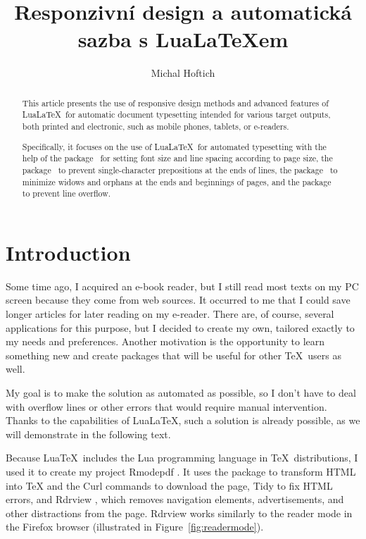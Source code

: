 \documentclass{ltugboat}
\title{Responzivní design a automatická sazba s Lua\LaTeX em}
\author{Michal Hoftich}
\newcommand\program[1]{#1}
\begin{document}
\maketitle

\begin{abstract}
This article presents the use of responsive design methods and advanced features
of Lua\LaTeX\ for automatic document typesetting intended for various target outputs,
both printed and electronic, such as mobile phones, tablets, or e-readers.

Specifically, it focuses on the use of Lua\LaTeX\ for automated
typesetting with the help of the  package~\cite{responsive} for setting font size and line spacing
according to page size, the  package~\cite{luavlna} to prevent single-character prepositions
at the ends of lines, the  package~\cite{lua-widow-control} to minimize widows and orphans at the ends and
beginnings of pages, and the  package~\cite{linebreaker} to prevent line overflow.

\end{abstract}


\section{Introduction}

Some time ago, I acquired an e-book reader, but I still read most texts on my PC screen because they come from web sources. It occurred to me that I could save longer articles for later reading on my e-reader. There are, of course, several applications for this purpose, but I decided to create my own, tailored exactly to my needs and preferences. Another motivation is the opportunity to learn something new and create packages that will be useful for other \TeX\ users as well.

My goal is to make the solution as automated as possible, so I don't have to deal with overflow lines or other errors that would require manual intervention. Thanks to the capabilities of Lua\LaTeX, such a solution is already possible, as we will demonstrate in the following text.

Because Lua\TeX\ includes the Lua programming language in \TeX\ distributions, I used it to create my project \program{Rmodepdf} \cite{rmodepdf}. It uses the  package \cite{luaxml} to transform HTML into \TeX{} and the \program{Curl} commands to download the page, \program{Tidy} to fix HTML errors, and \program{Rdrview} \cite{rdrview}, which removes navigation elements, advertisements, and other distractions from the page. \program{Rdrview} works similarly to the reader mode in the \program{Firefox} browser (illustrated in Figure~\ref{fig:readermode}).
\end{document}
